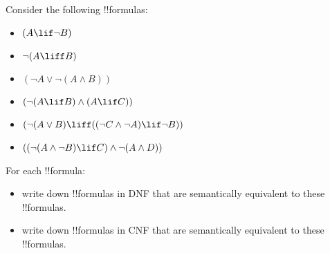 \documentclass[../../../include/open-logic-section]{subfiles}
\begin{document}
\begin{prob}
Consider the following !!{formula}s:
	\begin{itemize}
		\item $(A \lif \lnot B)$
		\item $\lnot (A \liff B)$
		\item $(\lnot A \lor \lnot (A \land B))$
		\item $(\lnot (A \lif B ) \land (A \lif C))$
		\item $(\lnot (A \lor B) \liff ((\lnot C \land \lnot A) \lif \lnot B))$
		\item $((\lnot (A \land \lnot B) \lif C) \land \lnot (A \land D))$
	\end{itemize}
For each !!{formula}:
	\begin{itemize}
		\item write down !!{formula}s in DNF that are semantically equivalent to these !!{formula}s.
		\item write down !!{formula}s in CNF that are semantically equivalent to these !!{formula}s. 
	\end{itemize}
\end{prob}
\end{document}
